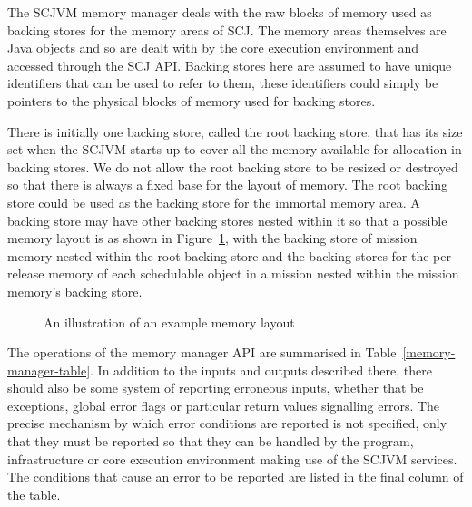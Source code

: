 \documentclass[a4paper,10pt]{report}
\begin{document}
The SCJVM memory manager deals with the raw blocks of memory used as
backing stores for the memory areas of SCJ.
The memory areas themselves are Java objects and so are dealt with by
the core execution environment and accessed through the SCJ API.
Backing stores here are assumed to have unique identifiers that can be
used to refer to them, these identifiers could simply be pointers to
the physical blocks of memory used for backing stores.

There is initially one backing store, called the root backing store,
that has its size set when the SCJVM starts up to cover all the memory
available for allocation in backing stores.
We do not allow the root backing store to be resized or destroyed so
that there is always a fixed base for the layout of memory.
The root backing store could be used as the backing store for the
immortal memory area.
A backing store may have other backing stores nested within it so that
a possible memory layout is as shown in Figure~\ref{memory-fig}, with
the backing store of mission memory nested within the root backing
store and the backing stores for the per-release memory of each
schedulable object in a mission nested within the mission memory's
backing store.

\begin{figure}[ht]
  \centering
  \caption{An illustration of an example memory layout}
  \label{memory-fig}
\end{figure}

The operations of the memory manager API are summarised in
Table~\ref{memory-manager-table}.
In addition to the inputs and outputs described there, there should
also be some system of reporting erroneous inputs, whether that be
exceptions, global error flags or particular return values signalling
errors.
The precise mechanism by which error conditions are reported is not
specified, only that they must be reported so that they can be handled
by the program, infrastructure or core execution environment making
use of the SCJVM services.
The conditions that cause an error to be reported are listed in the
final column of the table.
\end{document}
